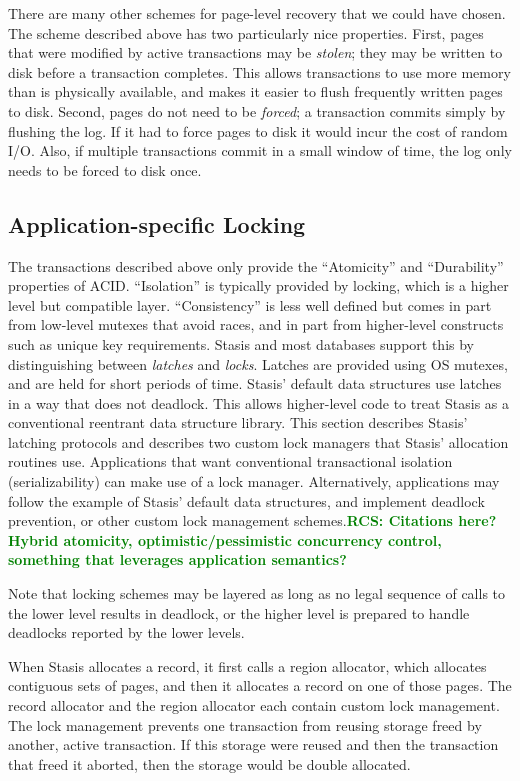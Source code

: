 \documentclass[letterpaper,twocolumn,10pt]{article}
\newcommand{\yad}{Stasis\xspace}
\newcommand{\yads}{Stasis'\xspace}
\newcommand{\rcs}[1]{\textcolor{green}{\bf RCS: #1}}
\begin{document}
{There are many other schemes for page-level recovery that we could
have chosen.  The scheme described above has two particularly nice
properties.  First, pages that were modified by active transactions
may be {\em stolen}; they may be written to disk before a transaction
completes.  This allows transactions to use more memory than is
physically available, and makes it easier to flush frequently written
pages to disk.  Second, pages do not need to be {\em forced}; a
transaction commits simply by flushing the log.  If it had to force
pages to disk it would incur the cost of random I/O.  Also, if
multiple transactions commit in a small window of time, the log only
needs to be forced to disk once.
}




\subsection{Application-specific Locking}
\label{sec:locking}
The transactions described above only provide the
``Atomicity'' and ``Durability'' properties of ACID.
  ``Isolation'' is
typically provided by locking, which is a higher level but
compatible layer.  ``Consistency'' is less well defined but comes in
part from low-level mutexes that avoid races, and in part from
higher-level constructs such as unique key requirements.  \yad and most databases support this by distinguishing between {\em latches} and {\em locks}.
Latches are provided using OS mutexes, and are held for
short periods of time.  \yads default data structures use latches in a
way that does not deadlock.  This allows higher-level code to treat 
\yad as a conventional reentrant data structure library.  
This section describes \yads latching protocols and describes two custom lock
managers that \yads allocation routines use.  Applications that want
conventional transactional isolation (serializability) can make 
use of a lock manager.  Alternatively, applications may follow 
the example of \yads default data structures, and implement 
deadlock prevention, or other custom lock management schemes.\rcs{Citations here? Hybrid atomicity, optimistic/pessimistic concurrency control, something that leverages application semantics?}

Note that locking schemes may be
layered as long as no legal sequence of calls to the lower level
results in deadlock, or the higher level is prepared to handle
deadlocks reported by the lower levels.

When \yad allocates a
record, it first calls a region allocator, which allocates contiguous
sets of pages, and then it allocates a record on one of those pages.
The record allocator and the region allocator each contain custom lock
management.  The lock management prevents one transaction from reusing 
storage freed by another, active transaction.  If this storage were 
reused and then the transaction that freed it aborted, then the 
storage would be double allocated.
\end{document}
